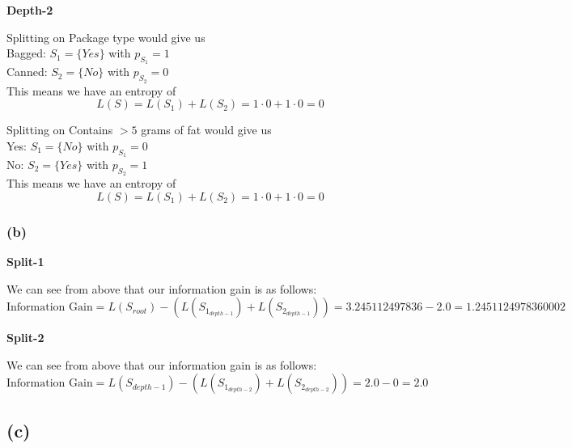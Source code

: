 \documentclass{article}
\begin{document}
\noindent \textbf{Depth-2}

Splitting on Package type would give us \\
Bagged: $S_1 = \{ Yes \} $ with $p_{S_1} = 1$ \\
Canned: $S_2 = \{ No \}$ with $p_{S_2} = 0$ \\
This means we have an entropy of
\[ L(S) = L(S_1) + L(S_2) = 1 \cdot 0 + 1 \cdot 0 = 0 \]

Splitting on Contains $> 5$ grams of fat would give us \\
Yes: $S_1 = \{ No \}$ with $p_{S_1} = 0$ \\
No: $S_2 = \{ Yes \}$ with $p_{S_2} = 1$ \\
This means we have an entropy of
\[ L(S) = L(S_1) + L(S_2) = 1 \cdot 0 + 1 \cdot 0 = 0 \]

\subsubsection*{(b)}
\noindent \textbf{Split-1}

We can see from above that our information gain is as follows:
\[ \text{Information Gain} = L(S_{root}) - (L(S_{1_{depth-1}}) + L(S_{2_{depth-1}})) =
    3.245112497836 - 2.0 = 1.2451124978360002 \]

\noindent \textbf{Split-2}

We can see from above that our information gain is as follows:
\[ \text{Information Gain} = L(S_{depth-1}) - (L(S_{1_{depth-2}}) + L(S_{2_{depth-2}})) =
    2.0 - 0 = 2.0 \]

\subsection*{(c)}

\vspace{5mm}
\end{document}

